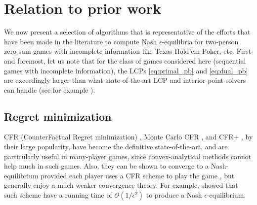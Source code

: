 \documentclass[a4paper,9pt]{extarticle}
\begin{document}
\section{Relation to prior work}
\label{sec:related_work}
We now present a selection of algorithms that is representative of the
efforts that have been made in the literature to compute Nash
$\epsilon$-equilibria for two-person zero-sum games with incomplete
information like Texas Hold'em Poker, etc.
First and foremost, let us note that for the class of games considered
here (sequential games with incomplete information), the LCPs
\eqref{eq:primal_pb} and \eqref{eq:dual_pb} are exceedingly larger
than what state-of-the-art LCP and interior-point solvers can
handle (see for example \cite{hoda2010smoothing,gilpinfirst}).

\subsection{Regret minimization}
CFR (CounterFactual Regret minimization) \cite{zinkevich2008regret},
Monte Carlo CFR \cite{lanctot2009monte}, and CFR+
\cite{Bowling09012015}, by their large popularity, have become the
definitive state-of-the-art, and are particularly useful in
many-player games, since convex-analytical methods cannot help much in
such games. Also, they can be shown to converge to a Nash-equilibrium
provided each player uses a CFR scheme to play the game
\cite{zinkevich2008regret}, but generally enjoy a much weaker
convergence theory. For example, \cite{lanctot2009monte} showed that
such scheme have a running time of $\mathcal{O}(1/\epsilon^2)$ to
produce a Nash $\epsilon$-equilibrium.
\end{document}
